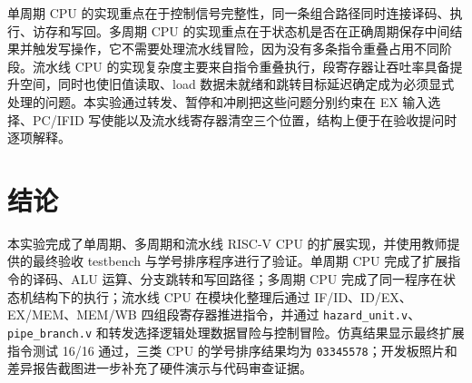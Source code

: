 \documentclass[UTF8,a4paper,12pt]{ctexart}
\begin{document}
单周期 CPU 的实现重点在于控制信号完整性，同一条组合路径同时连接译码、执行、访存和写回。多周期 CPU 的实现重点在于状态机是否在正确周期保存中间结果并触发写操作，它不需要处理流水线冒险，因为没有多条指令重叠占用不同阶段。流水线 CPU 的实现复杂度主要来自指令重叠执行，段寄存器让吞吐率具备提升空间，同时也使旧值读取、load 数据未就绪和跳转目标延迟确定成为必须显式处理的问题。本实验通过转发、暂停和冲刷把这些问题分别约束在 EX 输入选择、PC/IFID 写使能以及流水线寄存器清空三个位置，结构上便于在验收提问时逐项解释。

\section{结论}

本实验完成了单周期、多周期和流水线 RISC-V CPU 的扩展实现，并使用教师提供的最终验收 testbench 与学号排序程序进行了验证。单周期 CPU 完成了扩展指令的译码、ALU 运算、分支跳转和写回路径；多周期 CPU 完成了同一程序在状态机结构下的执行；流水线 CPU 在模块化整理后通过 IF/ID、ID/EX、EX/MEM、MEM/WB 四组段寄存器推进指令，并通过 \texttt{hazard\_unit.v}、\texttt{pipe\_branch.v} 和转发选择逻辑处理数据冒险与控制冒险。仿真结果显示最终扩展指令测试 16/16 通过，三类 CPU 的学号排序结果均为 \texttt{03345578}；开发板照片和差异报告截图进一步补充了硬件演示与代码审查证据。
\end{document}
